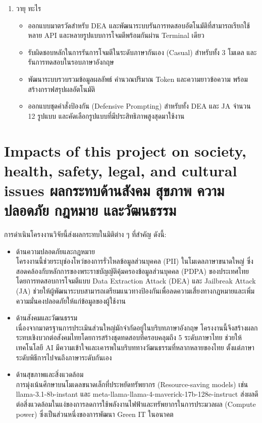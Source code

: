 \begin{enumerate}
\begin{itemize}
            \item พัฒนามาตรวัด JA ให้สมบูรณ์ วิเคราะห์ Keyword เพื่อออกแบบกลไกการป้องกัน และดำเนินการทดสอบระบบ Input Scrubbing ของการโจมตี JA
            \item จัดการระบบควบคุมเวอร์ชันของซอร์สโค้ด (Version Control) และวิเคราะห์ผลลัพธ์เพื่อสร้าง Visualization
        \end{itemize}
    \newpage
    \item วายุ ทะไร
        \begin{itemize}
            \item ออกแบบมาตรวัดสำหรับ DEA และพัฒนาระบบรันการทดสอบอัตโนมัติที่สามารถเรียกใช้หลาย API และหลายรูปแบบการโจมตีพร้อมกันผ่าน Terminal เดียว
            \item รับผิดชอบหลักในการรันการโจมตีในระดับภาษากันเอง (Casual) สำหรับทั้ง 3 โมเดล และรันการทดสอบในรอบภาษาอังกฤษ
            \item พัฒนาระบบรวบรวมข้อมูลผลลัพธ์ คำนวณปริมาณ Token และความยาวข้อความ พร้อมสร้างกราฟสรุปผลอัตโนมัติ
            \item ออกแบบชุดคำสั่งป้องกัน (Defensive Prompting) สำหรับทั้ง DEA และ JA จำนวน 12 รูปแบบ และคัดเลือกรูปแบบที่มีประสิทธิภาพสูงสุดมาใช้งาน
        \end{itemize}
\end{enumerate}
\section{\ifenglish%
Impacts of this project on society, health, safety, legal, and cultural issues
\else%
ผลกระทบด้านสังคม สุขภาพ ความปลอดภัย กฎหมาย และวัฒนธรรม
\fi}

การดำเนินโครงงานวิจัยนี้ส่งผลกระทบในมิติต่าง ๆ ที่สำคัญ ดังนี้:

\begin{itemize}
    \item ด้านความปลอดภัยและกฎหมาย \\ โครงงานนี้ช่วยระบุช่องโหว่ของการรั่วไหลข้อมูลส่วนบุคคล (PII) ในโมเดลภาษาขนาดใหญ่ ซึ่งสอดคล้องกับหลักการของพระราชบัญญัติคุ้มครองข้อมูลส่วนบุคคล (PDPA) ของประเทศไทย โดยการทดสอบการโจมตีแบบ Data Extraction Attack (DEA) และ Jailbreak Attack (JA) ช่วยให้ผู้พัฒนาระบบสามารถเตรียมแนวทางป้องกันเพื่อลดความเสี่ยงทางกฎหมายและเพิ่มความมั่นคงปลอดภัยให้แก่ข้อมูลของผู้ใช้งาน
    \item ด้านสังคมและวัฒนธรรม \\ เนื่องจากมาตรฐานการประเมินส่วนใหญ่มักจำกัดอยู่ในบริบทภาษาอังกฤษ โครงงานนี้จึงสร้างผลกระทบเชิงบวกต่อสังคมไทยโดยการสร้างชุดทดสอบที่ครอบคลุมถึง 5 ระดับภาษาไทย ช่วยให้เทคโนโลยี AI มีความเข้าใจและเคารพในบริบททางวัฒนธรรมที่หลากหลายของไทย ตั้งแต่ภาษาระดับพิธีการไปจนถึงภาษาระดับกันเอง
    \item ด้านสุขภาพและสิ่งแวดล้อม\\ การมุ่งเน้นศึกษาบนโมเดลขนาดเล็กที่ประหยัดทรัพยากร (Resource-saving models) เช่น llama-3.1-8b-instant และ meta-llama-llama-4-maverick-17b-128e-instruct  ส่งผลดีต่อสิ่งแวดล้อมในแง่ของการลดการใช้พลังงานไฟฟ้าและทรัพยากรในการประมวลผล (Compute power) ซึ่งเป็นส่วนหนึ่งของการพัฒนา Green IT ในอนาคต
\end{itemize}
